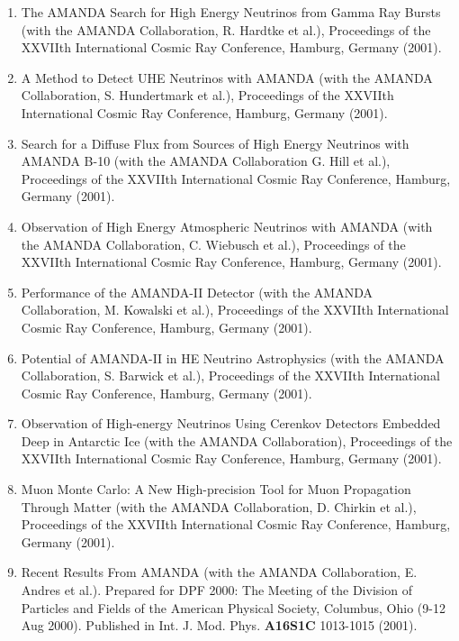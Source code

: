 \begin{enumerate}
\item The AMANDA Search for High Energy Neutrinos from Gamma Ray Bursts (with the AMANDA Collaboration, R. Hardtke et al.), Proceedings of the XXVIIth International Cosmic Ray Conference, Hamburg, Germany (2001).

\item A Method to Detect UHE Neutrinos with AMANDA (with the AMANDA Collaboration, S. Hundertmark et al.), Proceedings of the XXVIIth International Cosmic Ray Conference, Hamburg, Germany (2001).

\item Search for a Diffuse Flux from Sources of High Energy Neutrinos with AMANDA B-10 (with the AMANDA Collaboration G. Hill et al.), Proceedings of the XXVIIth International Cosmic Ray Conference, Hamburg, Germany (2001).

\item Observation of High Energy Atmospheric Neutrinos with AMANDA (with the AMANDA Collaboration, C. Wiebusch et al.), Proceedings of the XXVIIth International Cosmic Ray Conference, Hamburg, Germany (2001).

\item Performance of the AMANDA-II Detector (with the AMANDA Collaboration, M. Kowalski et al.), Proceedings of the XXVIIth International Cosmic Ray Conference, Hamburg, Germany (2001).

\item Potential of AMANDA-II in HE Neutrino Astrophysics (with the AMANDA Collaboration, S. Barwick et al.), Proceedings of the XXVIIth International Cosmic Ray Conference, Hamburg, Germany (2001).

\item Observation of High-energy Neutrinos Using Cerenkov Detectors Embedded Deep in Antarctic Ice (with the AMANDA Collaboration), Proceedings of the XXVIIth International Cosmic Ray Conference, Hamburg, Germany (2001).

\item Muon Monte Carlo: A New High-precision Tool for Muon Propagation Through Matter (with the AMANDA Collaboration, D. Chirkin et al.), Proceedings of the XXVIIth International Cosmic Ray Conference, Hamburg, Germany (2001).

\item Recent Results From AMANDA (with the AMANDA Collaboration, E. Andres et al.).  Prepared for DPF 2000: The Meeting of the Division of Particles and Fields of the American Physical Society, Columbus, Ohio (9-12 Aug 2000).   Published in Int. J. Mod. Phys. {\bf A16S1C} 1013-1015 (2001).


\end{enumerate}
